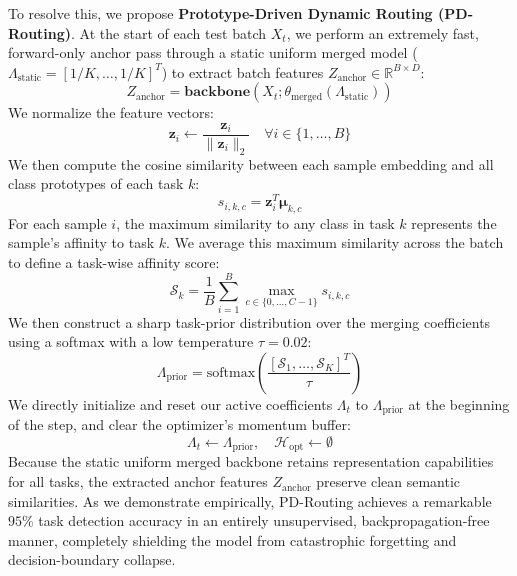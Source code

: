 \documentclass{article}
\theoremstyle{plain}
\theoremstyle{definition}
\theoremstyle{remark}
\begin{document}
To resolve this, we propose \textbf{Prototype-Driven Dynamic Routing (PD-Routing)}. At the start of each test batch $X_t$, we perform an extremely fast, forward-only anchor pass through a static uniform merged model ($\Lambda_{\text{static}} = [1/K, \dots, 1/K]^T$) to extract batch features $Z_{\text{anchor}} \in \mathbb{R}^{B \times D}$:
\begin{equation}
    Z_{\text{anchor}} = \mathbf{backbone}(X_t; \theta_{\text{merged}}(\Lambda_{\text{static}}))
\end{equation}
We normalize the feature vectors:
\begin{equation}
    \mathbf{z}_{i} \leftarrow \frac{\mathbf{z}_{i}}{\|\mathbf{z}_{i}\|_2} \quad \forall i \in \{1, \dots, B\}
\end{equation}
We then compute the cosine similarity between each sample embedding and all class prototypes of each task $k$:
\begin{equation}
    s_{i, k, c} = \mathbf{z}_i^T \mathbf{\mu}_{k, c}
\end{equation}
For each sample $i$, the maximum similarity to any class in task $k$ represents the sample's affinity to task $k$. We average this maximum similarity across the batch to define a task-wise affinity score:
\begin{equation}
    \mathcal{S}_k = \frac{1}{B} \sum_{i=1}^B \max_{c \in \{0, \dots, C-1\}} s_{i, k, c}
\end{equation}
We then construct a sharp task-prior distribution over the merging coefficients using a softmax with a low temperature $\tau = 0.02$:
\begin{equation}
    \Lambda_{\text{prior}} = \text{softmax}\left( \frac{[\mathcal{S}_1, \dots, \mathcal{S}_K]^T}{\tau} \right)
\end{equation}
We directly initialize and reset our active coefficients $\Lambda_t$ to $\Lambda_{\text{prior}}$ at the beginning of the step, and clear the optimizer's momentum buffer:
\begin{equation}
    \Lambda_t \leftarrow \Lambda_{\text{prior}}, \quad \mathcal{H}_{\text{opt}} \leftarrow \emptyset
\end{equation}
Because the static uniform merged backbone retains representation capabilities for all tasks, the extracted anchor features $Z_{\text{anchor}}$ preserve clean semantic similarities. As we demonstrate empirically, PD-Routing achieves a remarkable $95\%$ task detection accuracy in an entirely unsupervised, backpropagation-free manner, completely shielding the model from catastrophic forgetting and decision-boundary collapse.
\end{document}

